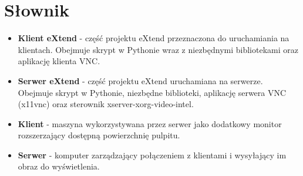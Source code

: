 \begin{comment}
  \begin{itemize}
    \item \textbf{display} \emph{identyfikator} \emph{URL} - informuje klienta, że nadano mu identyfikator \emph{id} i powinien użyć przeglądarkowego klienta VNC dostępnego pod adresem \emph{URL},
    \item \textbf{reconnect} \emph{identyfikator} - informuje serwer, że nawiązujący połączenie klient właśnie odświeżył stronę po nadaniu mu \emph{identyfikatora}, a nie jest kolejnym podłączającym się klientem,
    \item \textbf{reauth} \emph{URL\_do\_wylogowania} \emph{URL\_do\_zalogowania} \emph{login} \emph{hasło} - używane do autentykacji we front-endzie Guacamole po jego restarcie, w celu uzyskania dostępu do obrazu wysyłanego przez VNC.
  \end{itemize}

  \img{eXtend-web-client-sequence.png}{Komunikacja między elementami systemu w przypadku podłączenia klienta za pomocą przeglądarki internetowej}{GuacComm}

  Z powodu trudności technicznych oraz nietrywialnej konfiguracji wszystkich zależności tej wersji aplikacji powstał jedynie jej prototyp na jednej z używanych maszyn. Dalszy rozwój projektu w tym kierunku nie będzie wchodził w zakres tej pracy inżynierskiej.


\end{comment}


\section{Słownik}

  \begin{itemize}
    \item \textbf{Klient eXtend} - część projektu eXtend przeznaczona do uruchamiania na klientach. Obejmuje skrypt w Pythonie wraz z niezbędnymi bibliotekami oraz aplikację klienta VNC.
    \item \textbf{Serwer eXtend} - część projektu eXtend uruchamiana na serwerze. Obejmuje skrypt w Pythonie, niezbędne biblioteki, aplikację serwera VNC (x11vnc) oraz sterownik xserver-xorg-video-intel.
    \item \textbf{Klient} - maszyna wykorzystywana przez serwer jako dodatkowy monitor rozszerzający dostępną powierzchnię pulpitu.
    \item \textbf{Serwer} - komputer zarządzający połączeniem z klientami i wysyłający im obraz do wyświetlenia.
  \end{itemize}

